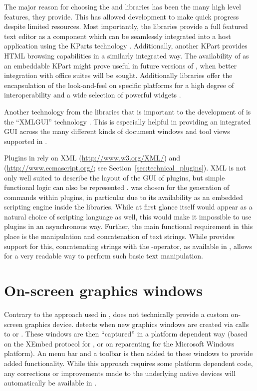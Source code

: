 \documentclass[article,shortnames]{jss}
\begin{document}
The major reason for choosing the  and  libraries has been the 
many high level features, they provide. This has allowed  development to make quick
progress despite limited resources. Most importantly, the  libraries provide a
full featured text editor \citep{CullmannND} as a component which can be
seamlessly integrated into a host application using the KParts technology
\citep{Faure2000}. Additionally, another KPart provides HTML browsing capabilities in a
similarly integrated way. The availability of  \citep{KWord} as an
embeddable KPart might prove useful in future versions of , when better
integration with office suites will be sought. Additionally  libraries offer 
the encapsulation of the look-and-feel on specific platforms for a high degree of interoperability 
and a wide selection of powerful widgets \citep{Raaphorst2003}.

Another technology from the  libraries that is important to the development
of  is the ``XMLGUI'' technology
\citep{Faure2000}. This is especially helpful in providing an integrated GUI across
the many different kinds of document windows and tool views supported in .

Plugins in  rely on XML (\url{http://www.w3.org/XML/})
and  (\url{http://www.ecmascript.org/}; see Section~\ref{sec:technical_plugins}). XML is not
only well suited to describe the layout of the GUI of plugins, but simple
functional logic can also be represented \citep[see also][]{Visne2009}.  was
chosen for the generation of  commands within plugins, in particular due to its
availability as an embedded scripting engine inside the  libraries. While at
first glance  itself would appear as a natural choice of scripting language as
well, this would make it impossible to use plugins in an asynchronous way.
Further, the main functional requirement in this place is the manipulation and
concatenation of text strings. While  provides support for this, concatenating
strings with the \code{+}-operator, as available in , allows for a
very readable way to perform such basic text manipulation.

\section{On-screen graphics windows}
\label{sec:technical_graphics}
Contrary to the approach used in  \citep{JGR2010},  does
not technically provide a custom on-screen graphics device.  detects when
new graphics windows are created via calls to  or . These windows
are then ``captured'' in a platform dependent way (based on the XEmbed \citep{Ettrich2002} protocol
for , or on reparenting for the Microsoft Windows platform). An  menu bar and a
toolbar is then added to these windows to provide added functionality. While
this approach requires some platform dependent code, any corrections or
improvements made to the underlying  native devices will automatically be
available in .
\end{document}
